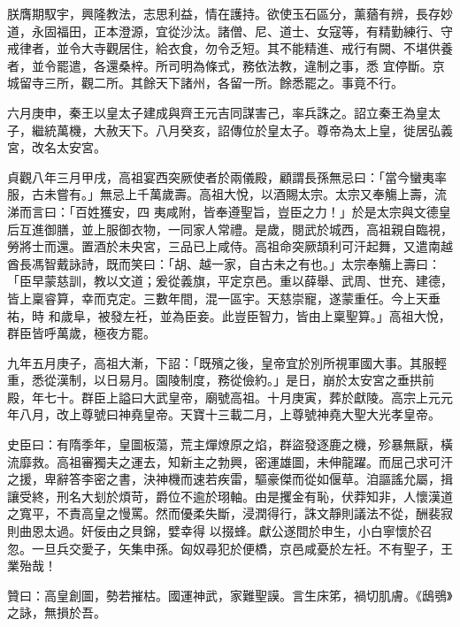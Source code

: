 \begin{pinyinscope}
 朕膺期馭宇，興隆教法，志思利益，情在護持。欲使玉石區分，薰蕕有辨，長存妙道，永固福田，正本澄源，宜從沙汰。諸僧、尼、道士、女寇等，有精勤練行、守戒律者，並令大寺觀居住，給衣食，勿令乏短。其不能精進、戒行有闕、不堪供養者，並令罷遣，各還桑梓。所司明為條式，務依法教，違制之事，悉
 宜停斷。京城留寺三所，觀二所。其餘天下諸州，各留一所。餘悉罷之。事竟不行。



 六月庚申，秦王以皇太子建成與齊王元吉同謀害己，率兵誅之。詔立秦王為皇太子，繼統萬機，大赦天下。八月癸亥，詔傳位於皇太子。尊帝為太上皇，徙居弘義宮，改名太安宮。



 貞觀八年三月甲戌，高祖宴西突厥使者於兩儀殿，顧謂長孫無忌曰：「當今蠻夷率服，古未嘗有。」無忌上千萬歲壽。高祖大悅，以酒賜太宗。太宗又奉觴上壽，流涕而言曰：「百姓獲安，四
 夷咸附，皆奉遵聖旨，豈臣之力！」於是太宗與文德皇后互進御膳，並上服御衣物，一同家人常禮。是歲，閱武於城西，高祖親自臨視，勞將士而還。置酒於未央宮，三品已上咸侍。高祖命突厥頡利可汗起舞，又遣南越酋長馮智戴詠詩，既而笑曰：「胡、越一家，自古未之有也。」太宗奉觴上壽曰：「臣早蒙慈訓，教以文道；爰從義旗，平定京邑。重以薛舉、武周、世充、建德，皆上稟睿算，幸而克定。三數年間，混一區宇。天慈崇寵，遂蒙重任。今上天垂祐，時
 和歲阜，被發左衽，並為臣妾。此豈臣智力，皆由上稟聖算。」高祖大悅，群臣皆呼萬歲，極夜方罷。



 九年五月庚子，高祖大漸，下詔：「既殯之後，皇帝宜於別所視軍國大事。其服輕重，悉從漢制，以日易月。園陵制度，務從儉約。」是日，崩於太安宮之垂拱前殿，年七十。群臣上謚曰大武皇帝，廟號高祖。十月庚寅，葬於獻陵。高宗上元元年八月，改上尊號曰神堯皇帝。天寶十三載二月，上尊號神堯大聖大光孝皇帝。



 史臣曰：有隋季年，皇圖板蕩，荒主燀燎原之焰，群盜發逐鹿之機，殄暴無厭，橫流靡救。高祖審獨夫之運去，知新主之勃興，密運雄圖，未伸龍躍。而屈己求可汗之援，卑辭答李密之書，決神機而速若疾雷，驅豪傑而從如偃草。洎謳謠允屬，揖讓受終，刑名大刬於煩苛，爵位不逾於珝軸。由是攫金有恥，伏莽知非，人懷漢道之寬平，不責高皇之慢罵。然而優柔失斷，浸潤得行，誅文靜則議法不從，酬裴寂則曲恩太過。奸佞由之貝錦，嬖幸得
 以掇蜂。獻公遂間於申生，小白寧懷於召忽。一旦兵交愛子，矢集申孫。匈奴尋犯於便橋，京邑咸憂於左衽。不有聖子，王業殆哉！



 贊曰：高皇創圖，勢若摧枯。國運神武，家難聖謨。言生床笫，禍切肌膚。《鴟鴞》之詠，無損於吾。



\end{pinyinscope}